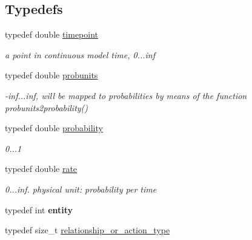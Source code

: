 \subsection*{Typedefs}
\begin{DoxyCompactItemize}
\item 
\mbox{\label{namespacetricl_a720ff6a29f998e11e1d3622fc8df64b1}} 
typedef double \hyperlink{namespacetricl_a720ff6a29f998e11e1d3622fc8df64b1}{timepoint}
\begin{DoxyCompactList}\small\item\em a point in continuous model time, 0...inf \end{DoxyCompactList}\item 
\mbox{\label{namespacetricl_af8f8f9076e92e1c664ffa96f18d038a5}} 
typedef double \hyperlink{namespacetricl_af8f8f9076e92e1c664ffa96f18d038a5}{probunits}
\begin{DoxyCompactList}\small\item\em -\/inf...inf, will be mapped to probabilities by means of the function probunits2probability() \end{DoxyCompactList}\item 
\mbox{\label{namespacetricl_af2e8973ba58a3dad9061296d8bee16a2}} 
typedef double \hyperlink{namespacetricl_af2e8973ba58a3dad9061296d8bee16a2}{probability}
\begin{DoxyCompactList}\small\item\em 0...1 \end{DoxyCompactList}\item 
\mbox{\label{namespacetricl_ae42d2696f294300a43e0f5edf4875479}} 
typedef double \hyperlink{namespacetricl_ae42d2696f294300a43e0f5edf4875479}{rate}
\begin{DoxyCompactList}\small\item\em 0...inf. physical unit\+: probability per time \end{DoxyCompactList}\item 
\mbox{\label{namespacetricl_a57273122278e8b301844e2a2e1f0742f}} 
typedef int {\bfseries entity}
\item 
\mbox{\label{namespacetricl_a2d01894944fb58a8fedc0912a48d13f8}} 
typedef size\+\_\+t \hyperlink{namespacetricl_a2d01894944fb58a8fedc0912a48d13f8}{relationship\+\_\+or\+\_\+action\+\_\+type}

\end{DoxyCompactItemize}
